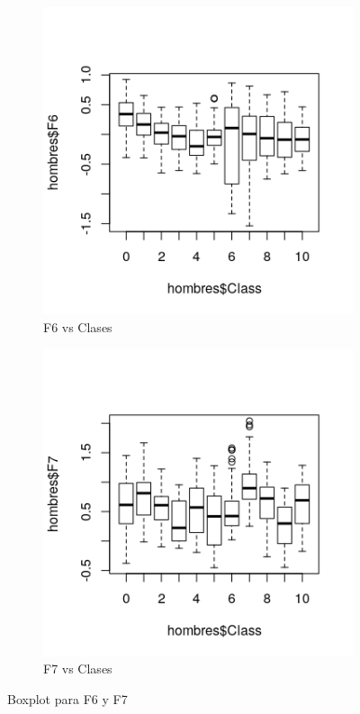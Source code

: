\begin{itemize}
\begin{itemize}
	\begin{figure}[H]
		\centering
		\begin{subfigure}{.5\textwidth}
			\centering
			\includegraphics[width=.8\linewidth]{bphF6.png}
			\caption{F6 vs Clases}
			\label{fig:bphF6}
		\end{subfigure}%
		\begin{subfigure}{.5\textwidth}
			\centering
			\includegraphics[width=.8\linewidth]{bphF7.png}
			\caption{F7 vs Clases}
			\label{fig:bphF7}
		\end{subfigure}
		\caption{Boxplot para F6 y F7}
		\label{fig:bph67}
	\end{figure}


\end{itemize}
\end{itemize}
